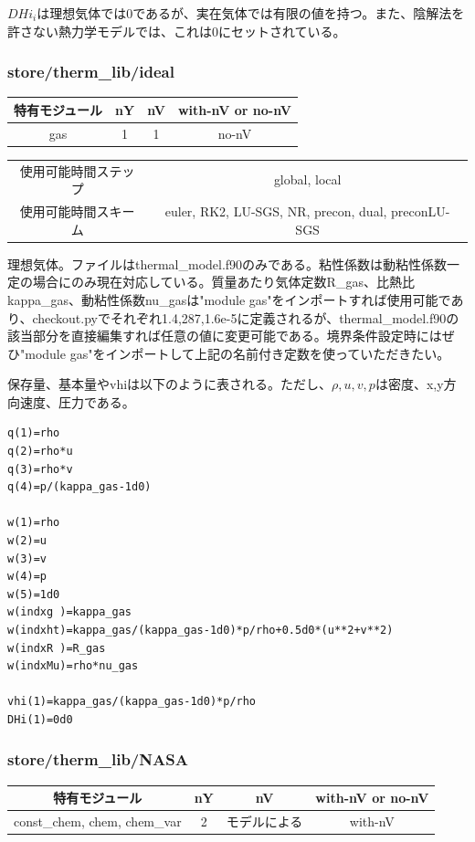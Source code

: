 \documentclass{jsarticle}
\begin{document}
$DHi_i$は理想気体では0であるが、実在気体では有限の値を持つ。また、陰解法を許さない熱力学モデルでは、これは0にセットされている。

\subsubsection{store/therm\_lib/ideal}%
\begin{center}
\begin{tabular}{cccc}\hline
特有モジュール & nY & nV & with-nV or no-nV\\\hline \hline
gas            &  1 &  1 & no-nV\\
\hline
\end{tabular}
\end{center}

\begin{center}
\begin{tabular}{c||c}\hline
使用可能時間ステップ & global, local\\
使用可能時間スキーム & euler, RK2, LU-SGS, NR, precon, dual, preconLU-SGS\\
\hline
\end{tabular}
\end{center}

理想気体。ファイルはthermal\_model.f90のみである。粘性係数は動粘性係数一定の場合にのみ現在対応している。質量あたり気体定数R\_gas、比熱比kappa\_gas、動粘性係数nu\_gasは"module gas"をインポートすれば使用可能であり、checkout.pyでそれぞれ1.4,287,1.6e-5に定義されるが、thermal\_model.f90の該当部分を直接編集すれば任意の値に変更可能である。境界条件設定時にはぜひ"module gas"をインポートして上記の名前付き定数を使っていただきたい。

保存量、基本量やvhiは以下のように表される。ただし、$\rho,u,v,p$は密度、x,y方向速度、圧力である。
\begin{verbatim}
q(1)=rho
q(2)=rho*u
q(3)=rho*v
q(4)=p/(kappa_gas-1d0)

w(1)=rho
w(2)=u
w(3)=v
w(4)=p
w(5)=1d0
w(indxg )=kappa_gas
w(indxht)=kappa_gas/(kappa_gas-1d0)*p/rho+0.5d0*(u**2+v**2)
w(indxR )=R_gas
w(indxMu)=rho*nu_gas

vhi(1)=kappa_gas/(kappa_gas-1d0)*p/rho
DHi(1)=0d0
\end{verbatim}
\subsubsection{store/therm\_lib/NASA}\label{store/therm_lib/NASA}%
\begin{center}
\begin{tabular}{cccc}\hline
特有モジュール               & nY &            nV & with-nV or no-nV\\\hline \hline
const\_chem, chem, chem\_var &  2 &  モデルによる & with-nV\\
\hline
\end{tabular}
\end{center}
\end{document}
